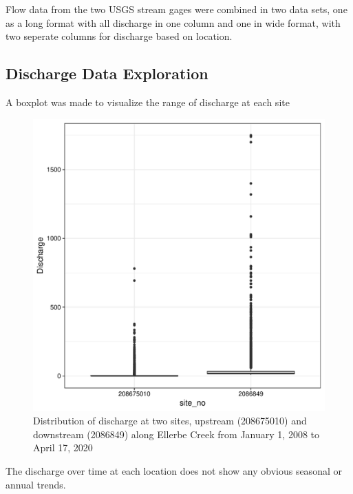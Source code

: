 \documentclass[12pt,]{article}
\begin{document}
Flow data from the two USGS stream gages were combined in two data sets,
one as a long format with all discharge in one column and one in wide
format, with two seperate columns for discharge based on location.

\hypertarget{discharge-data-exploration}{%
\subsection{Discharge Data
Exploration}\label{discharge-data-exploration}}

A boxplot was made to visualize the range of discharge at each site

\begin{figure}
\centering
\includegraphics{Landman_ENV872_Project_files/figure-latex/Exploratory Analysis Figure 2-1.pdf}
\caption{Distribution of discharge at two sites, upstream (208675010)
and downstream (2086849) along Ellerbe Creek from January 1, 2008 to
April 17, 2020}
\end{figure}

\newpage

The discharge over time at each location does not show any obvious
seasonal or annual trends.
\end{document}
